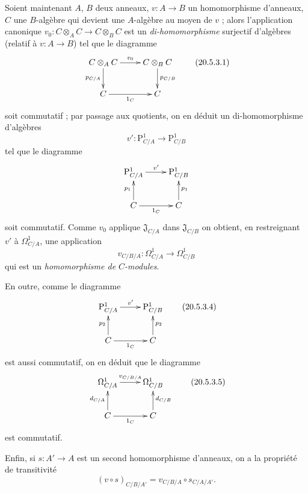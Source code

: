 \begin{env}[20.5.3]
\label{0.20.5.3-fr}
Soient maintenant $A$, $B$ deux anneaux, $v:A\to B$ un homomorphisme
d'anneaux, $C$ une $B$-algèbre qui devient une $A$-algèbre au moyen de $v$ ;
alors l'application canonique $v_0:C\otimes_A C\to C\otimes_B C$ est un
\emph{di-homomorphisme} surjectif d'algèbres (relatif à $v:A\to B$) tel que
le diagramme
\[
\xymatrix{
  C\otimes_A C \ar[r]^{v_0} \ar[d]_{p_{C/A}} &
  C\otimes_B C \ar[d]^{p_{C/B}} \\
  C \ar[r]_{1_C} & C
}
\tag{20.5.3.1}
\label{0.20.5.3.1-fr}
\]
soit commutatif ; par passage aux quotients, on en déduit un
di-homomorphisme d'algèbres
\begin{equation}
\tag{20.5.3.2}
\label{0.20.5.3.2-fr}
  v':\mathrm{P}^1_{C/A}\to\mathrm{P}^1_{C/B}
\end{equation}
tel que le diagramme
\[
\xymatrix{
  \mathrm{P}^1_{C/A} \ar[r]^{v'} & \mathrm{P}^1_{C/B} \\
  C \ar[u]^{p_1} \ar[r]_{1_C} & C \ar[u]_{p_1}
}
\]
soit commutatif. Comme $v_0$ applique $\mathfrak{J}_{C/A}$ dans
$\mathfrak{J}_{C/B}$ on obtient, en restreignant $v'$ à
$\Omega^1_{C/A}$, une application
\begin{equation}
\tag{20.5.3.3}
\label{0.20.5.3.3-fr}
  v_{C/B/A}:\Omega^1_{C/A}\to\Omega^1_{C/B}
\end{equation}
qui est un \emph{homomorphisme de $C$-modules}.

En outre, comme le diagramme
\[
\xymatrix{
  \mathrm{P}^1_{C/A} \ar[r]^{v'} & \mathrm{P}^1_{C/B} \\
  C \ar[u]^{p_2} \ar[r]_{1_C} & C \ar[u]_{p_2}
}
\tag{20.5.3.4}
\label{0.20.5.3.4-fr}
\]
est aussi commutatif, on en déduit que le diagramme
\[
\xymatrix{
  \Omega^1_{C/A} \ar[r]^{v_{C/B/A}} & \Omega^1_{C/B} \\
  C \ar[u]^{d_{C/A}} \ar[r]_{1_C} & C \ar[u]_{d_{C/B}}
}
\tag{20.5.3.5}
\label{0.20.5.3.5-fr}
\]
est commutatif.

Enfin, si $s:A'\to A$ est un second homomorphisme d'anneaux, on a la
propriété de transitivité
\begin{equation}
\tag{20.5.3.6}
\label{0.20.5.3.6-fr}
  (v\circ s)_{C/B/A'}=v_{C/B/A}\circ s_{C/A/A'}.
\end{equation}
\end{env}

